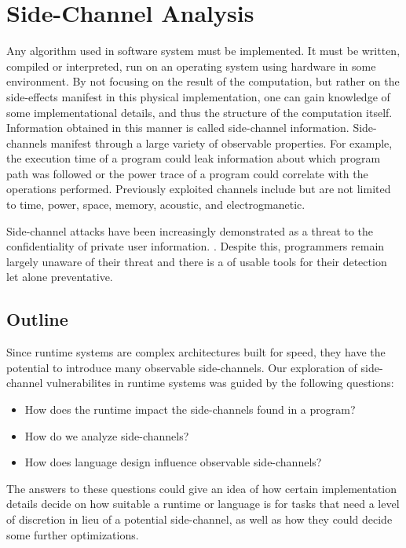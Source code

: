 \section{Side-Channel Analysis}

Any algorithm used in software system must be implemented. It must be written, compiled or interpreted, run on an operating system using hardware in some environment. 
By not focusing on the result of the computation, but rather on the side-effects
manifest in this physical implementation, one can gain knowledge of some
implementational details, and thus the structure of the computation itself. Information obtained in this manner is called side-channel information. Side-channels manifest through a large variety of observable properties. For example, the execution time of a program could leak information about which program path was followed or the power trace of a program could correlate with the operations performed. Previously exploited channels include but are not limited to time, power, space, memory, acoustic, and electrogmanetic. 

Side-channel attacks have been increasingly demonstrated as a threat to the confidentiality of private user information. \cite{brumley2005remote, brumley2011remote, hund2013practical, mangard2008power,messerges2000using}. Despite this, programmers remain largely unaware of their threat and there is a of usable tools for their detection let alone preventative. 


\subsection{Outline}
Since runtime systems are complex architectures built for speed, they have the potential to introduce many observable side-channels. Our exploration of side-channel vulnerabilites in runtime systems was guided by the following questions:
\begin{itemize}     
	\item{How does the runtime impact the side-channels found in a program?}
	\item{How do we analyze side-channels?}
	\item{How does language design influence observable side-channels?}
\end{itemize}

The answers to these questions could give an idea of how certain implementation
details decide on how suitable a runtime or language is for tasks that need a level
of discretion in lieu of a potential side-channel, as well as how they could 
decide some further optimizations.


